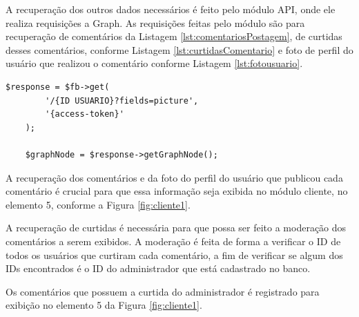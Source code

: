 A recuperação dos outros dados necessários é feito pelo módulo API, onde ele realiza requisições a Graph. As requisições feitas pelo módulo são para recuperação de comentários da Listagem \ref{lst:comentariosPostagem}, de curtidas desses comentários, conforme Listagem \ref{lst:curtidasComentario} e foto de perfil do usuário que realizou o comentário conforme Listagem \ref{lst:fotousuario}.

\begin{lstlisting}[caption={Foto de usuário},label={lst:fotousuario}]
  	$response = $fb->get(
    	'/{ID USUARIO}?fields=picture',
		'{access-token}'
	);
	
	$graphNode = $response->getGraphNode();
\end{lstlisting}

A recuperação dos comentários e da foto do perfil do usuário que publicou cada comentário é crucial para que essa informação seja exibida no módulo cliente, no elemento 5, conforme a Figura \ref{fig:cliente1}.

A recuperação de curtidas é necessária para que possa ser feito a moderação dos comentários a serem exibidos. A moderação é feita de forma a verificar o ID de todos os usuários que curtiram cada comentário, a fim de verificar se algum dos IDs encontrados é o ID do administrador que está cadastrado no banco.

Os comentários que possuem a curtida do administrador é registrado para exibição no elemento 5 da Figura \ref{fig:cliente1}.